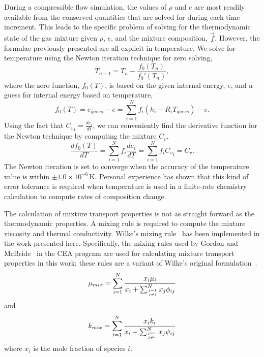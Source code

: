 \medskip
During a compressible flow simulation, the values of $\rho$ and $e$ are most
readily available from the conserved quantities that are solved for during
each time increment.
This leads to the specific problem of solving for the thermodynamic
state of the gas mixture given $\rho$, $e$, and the mixture composition, $\overrightarrow{f}$.
However, the formulae previously presented are all explicit in temperature.
We solve for temperature using the Newton iteration technique for zero solving,
\begin{equation}
T_{n+1} = T_n - \frac{f_0(T_n)}{f_0'(T_n)},
\end{equation}
where the zero function, $f_0(T)$, is based on the given internal energy, $e$, and
a guess for internal energy based on temperature,
\begin{equation}
f_0(T) = e_{guess} - e = \sum_{i=1}^{N} f_i \left( h_i - R_i T_{guess} \right) - e.
\end{equation}
Using the fact that ${C_v}_i = \frac{de_i}{dt}$, we can conveniently find the derivative
function for the Newton technique by computing the mixture $C_v$,
\begin{equation}
\frac{df_0(T)}{dT} = \sum_{i=1}^{N} f_i \frac{de_i}{dT} = \sum_{i=1}^{N} f_i {C_v}_i = C_v.
\end{equation}
The Newton iteration is set to converge when the accuracy of the temperature value is
within $\pm 1.0\times10^{-6}$\,K.
Personal experience has shown that this kind of error tolerance is required when temperature
is used in a finite-rate chemistry calculation to compute rates of composition change.

\medskip
The calculation of mixture transport properties is not as straight forward
as the thermodynamic properties.
A mixing rule is required to compute the mixture viscosity and thermal
conductivity.
Wilke's mixing rule~\cite{wilke_50} has been implemented in the work
presented here.
Specifically, the mixing rules used by Gordon and McBride~\cite{gordon_mcbride_94} in the CEA program are used
for calculating mixture transport properties in this work; these rules are a variant of Wilke's original formulation~\cite{wilke_50}.
\begin{equation}
   \mu_{mix} = \sum_{i=1}^N \frac{x_i \mu_i}{x_i + \sum_{\genfrac{}{}{0pt}{}{j=1}{j\neq i}}^N x_j \phi_{ij}}
\end{equation}
and
\begin{equation}
   k_{mix} = \sum_{i=1}^N \frac{x_i k_i}{x_i + \sum_{\genfrac{}{}{0pt}{}{j=1}{j\neq i}}^N x_j \psi_{ij}}
\end{equation}
where $x_i$ is the mole fraction of species $i$.

